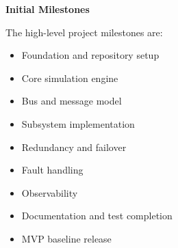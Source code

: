 \documentclass[12pt]{article}
\begin{document}
\textbf{Initial Milestones}

The high-level project milestones are:

\begin{itemize}[leftmargin=*]
    \item Foundation and repository setup
    \item Core simulation engine
    \item Bus and message model
    \item Subsystem implementation
    \item Redundancy and failover
    \item Fault handling
    \item Observability
    \item Documentation and test completion
    \item MVP baseline release
\end{itemize}
\end{document}
